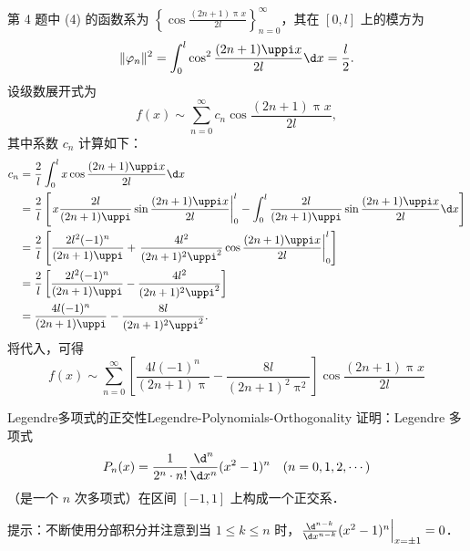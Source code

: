 \begin{solution}
    第 4 题中 (4) 的函数系为 $\left\{ \cos \frac{(2n+1)\uppi x}{2l} \right\}_{n=0}^{\infty}$，其在 $[0, l]$ 上的模方为
    \begin{equation}\label{eq:norm-6}
        \|\varphi_n\|^2 = \int_{0}^{l} \cos^2 \frac{(2n+1)\uppi x}{2l} \d x = \frac{l}{2}.
    \end{equation}
    设级数展开式为
    \begin{equation}\label{eq:series-6}
        f(x) \sim \sum_{n=0}^{\infty} c_n \cos \frac{(2n+1)\uppi x}{2l},
    \end{equation}
    其中系数 $c_n$ 计算如下：
    \begin{equation}\label{eq:coeff-6}
        \begin{aligned}
            c_n & = \frac{2}{l} \int_{0}^{l} x \cos \frac{(2n+1)\uppi x}{2l} \d x                                                                                                                     \\
                & = \frac{2}{l} \left[ \left. x \frac{2l}{(2n+1)\uppi} \sin \frac{(2n+1)\uppi x}{2l} \right|_{0}^{l} - \int_{0}^{l} \frac{2l}{(2n+1)\uppi} \sin \frac{(2n+1)\uppi x}{2l} \d x \right] \\
                & = \frac{2}{l} \left[ \frac{2l^2(-1)^n}{(2n+1)\uppi} + \left. \frac{4l^2}{(2n+1)^2\uppi^2} \cos \frac{(2n+1)\uppi x}{2l} \right|_{0}^{l} \right]                                     \\
                & = \frac{2}{l} \left[ \frac{2l^2(-1)^n}{(2n+1)\uppi} - \frac{4l^2}{(2n+1)^2\uppi^2} \right]                                                                                          \\
                & = \frac{4l(-1)^n}{(2n+1)\uppi} - \frac{8l}{(2n+1)^2\uppi^2}.
        \end{aligned}
    \end{equation}
    将代入，可得
    \begin{equation}
        \boxed{f(x) \sim \sum_{n=0}^{\infty} \left[ \frac{4l(-1)^n}{(2n+1)\uppi} - \frac{8l}{(2n+1)^2\uppi^2} \right] \cos \frac{(2n+1)\uppi x}{2l}}
    \end{equation}
\end{solution}

\begin{problem}{Legendre多项式的正交性}{Legendre-Polynomials-Orthogonality}
    证明：Legendre 多项式
    \begin{equation}\label{eq:legendre-def-7}
        P_n(x) = \frac{1}{2^n \cdot n!} \frac{\d^n}{\d x^n} (x^2 - 1)^n \quad (n = 0, 1, 2, \cdots)
    \end{equation}
    （是一个 $n$ 次多项式）在区间 $[-1, 1]$ 上构成一个正交系．

    提示：不断使用分部积分并注意到当 $1 \leqslant k \leqslant n$ 时，$\left. \frac{\d^{n-k}}{\d x^{n-k}} (x^2 - 1)^n \right|_{x=\pm 1} = 0$．
\end{problem}

